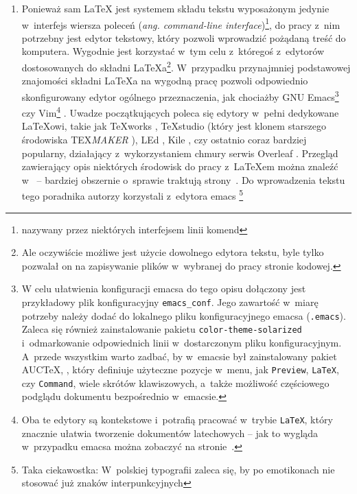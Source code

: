 \begin{enumerate}
\item Ponieważ sam \LaTeX{} jest systemem składu tekstu wyposażonym jedynie w~interfejs wiersza poleceń (\emph{ang. command-line interface})\footnote{nazywany przez niektórych interfejsem linii komend}, do pracy z~nim potrzebny jest edytor tekstowy, który pozwoli wprowadzić pożądaną treść do komputera. Wygodnie jest korzystać w~tym celu z~któregoś z~edytorów dostosowanych do składni \LaTeX{}a\footnote{Ale oczywiście możliwe jest użycie dowolnego edytora tekstu, byle tylko pozwalał on na zapisywanie plików w~wybranej do pracy stronie kodowej.}. W~przypadku przynajmniej podstawowej znajomości składni \LaTeX{}a na wygodną pracę pozwoli odpowiednio skonfigurowany edytor ogólnego przeznaczenia, jak chociażby GNU Emacs\footnote{W celu ułatwienia konfiguracji emacsa do tego opisu dołączony jest przykładowy plik konfiguracyjny \texttt{emacs\_conf}. Jego zawartość w~miarę potrzeby należy dodać do lokalnego pliku konfiguracyjnego emacsa (\texttt{.emacs}). Zaleca się również zainstalowanie pakietu \texttt{color-theme-solarized} i~odmarkowanie odpowiednich linii w~dostarczonym pliku konfiguracyjnym. A~przede wszystkim warto zadbać, by w~emacsie był zainstalowany pakiet AUC\TeX, \cite{auctex}, który definiuje użyteczne pozycje w~menu, jak \texttt{Preview}, \texttt{LaTeX}, czy \texttt{Command}, wiele skrótów klawiszowych, a~także możliwość częściowego podglądu dokumentu bezpośrednio w~emacsie.} \cite{emacs, emacs_wiki} czy Vim\footnote{Oba te edytory są kontekstowe i~potrafią pracować w~trybie \texttt{LaTeX}, który znacznie ułatwia tworzenie dokumentów latechowych -- jak to wygląda w~przypadku emacsa można zobaczyć na stronie~\cite{emacslatex}.} \cite{vim_wiki}. Uwadze początkujących poleca się edytory w~pełni dedykowane \LaTeX{}owi, takie jak TeXworks \cite{texworks}, TeXstudio \cite{texstudio,texstudio_opis} (który jest klonem starszego środowiska TEX{\it MAKER} \cite{texmaker}), LEd \cite{led}, Kile \cite{kile}, czy ostatnio coraz bardziej popularny, działający z~wykorzystaniem chmury serwis Overleaf \cite{overleaf}. Przegląd zawierający opis niektórych środowisk do pracy z~\LaTeX{}em można znaleźć w~\cite{programy_przeglad} -- bardziej obszernie o~sprawie traktują strony~\cite{latex_editors,latex_editors_wiki}. Do wprowadzenia tekstu tego poradnika autorzy korzystali z~edytora emacs \smiley\footnote{Taka ciekawostka: W~polskiej typografii zaleca się, by po emotikonach nie stosować już znaków interpunkcyjnych \smiley}


\end{enumerate}
